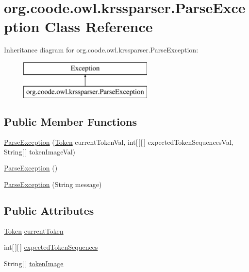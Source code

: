 \hypertarget{classorg_1_1coode_1_1owl_1_1krssparser_1_1_parse_exception}{\section{org.\-coode.\-owl.\-krssparser.\-Parse\-Exception Class Reference}
\label{classorg_1_1coode_1_1owl_1_1krssparser_1_1_parse_exception}
}
Inheritance diagram for org.\-coode.\-owl.\-krssparser.\-Parse\-Exception\-:\begin{figure}[H]
\begin{center}
\leavevmode
\includegraphics[height=2.000000cm]{classorg_1_1coode_1_1owl_1_1krssparser_1_1_parse_exception}
\end{center}
\end{figure}
\subsection*{Public Member Functions}
\begin{DoxyCompactItemize}
\item 
\hyperlink{classorg_1_1coode_1_1owl_1_1krssparser_1_1_parse_exception_a4cfd138299c1ea16254d433ca633d132}{Parse\-Exception} (\hyperlink{classorg_1_1coode_1_1owl_1_1krssparser_1_1_token}{Token} current\-Token\-Val, int\mbox{[}$\,$\mbox{]}\mbox{[}$\,$\mbox{]} expected\-Token\-Sequences\-Val, String\mbox{[}$\,$\mbox{]} token\-Image\-Val)
\item 
\hyperlink{classorg_1_1coode_1_1owl_1_1krssparser_1_1_parse_exception_a334524b4daf8c0f0be37fcdcb624becc}{Parse\-Exception} ()
\item 
\hyperlink{classorg_1_1coode_1_1owl_1_1krssparser_1_1_parse_exception_ae8db851a549ea3781dabec14e690a738}{Parse\-Exception} (String message)
\end{DoxyCompactItemize}
\subsection*{Public Attributes}
\begin{DoxyCompactItemize}
\item 
\hyperlink{classorg_1_1coode_1_1owl_1_1krssparser_1_1_token}{Token} \hyperlink{classorg_1_1coode_1_1owl_1_1krssparser_1_1_parse_exception_a89ee6ad992183aa86c5c6be1837a8533}{current\-Token}
\item 
int\mbox{[}$\,$\mbox{]}\mbox{[}$\,$\mbox{]} \hyperlink{classorg_1_1coode_1_1owl_1_1krssparser_1_1_parse_exception_aa0ae4f7b0293b5858c90e5b2db994f3c}{expected\-Token\-Sequences}
\item 
String\mbox{[}$\,$\mbox{]} \hyperlink{classorg_1_1coode_1_1owl_1_1krssparser_1_1_parse_exception_af6ee3cfb4377ffaa7eaa55dc3fa619ae}{token\-Image}
\end{DoxyCompactItemize}
